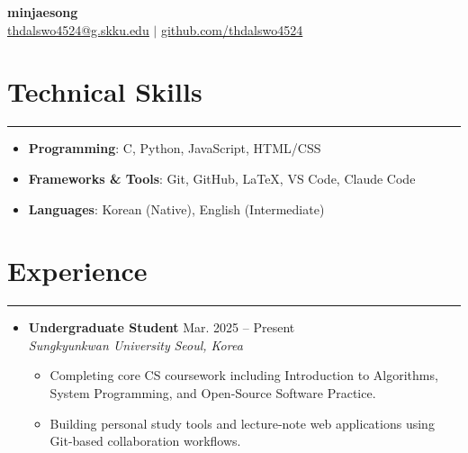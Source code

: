 \documentclass[letterpaper, 10pt]{article}
\begin{document}
\begin{center}
    \textbf{\LARGE minjaesong} \\ \vspace{2pt}
    \href{mailto:thdalswo4524@g.skku.edu}{\underline{thdalswo4524@g.skku.edu}} $|$
    \href{https://github.com/thdalswo4524}{\underline{github.com/thdalswo4524}}
\end{center}

\section*{Technical Skills}
\hrule
\vspace{4pt}
\begin{itemize}
    \item[] \textbf{Programming}: C, Python, JavaScript, HTML/CSS
    \item[] \textbf{Frameworks \& Tools}: Git, GitHub, LaTeX, VS Code, Claude Code
    \item[] \textbf{Languages}: Korean (Native), English (Intermediate)
\end{itemize}

\section*{Experience}
\hrule
\vspace{4pt}
\begin{itemize}
    \item[]
    \textbf{Undergraduate Student} \hfill Mar. 2025 -- Present \\
    \textit{Sungkyunkwan University} \hfill \textit{Seoul, Korea}
    \begin{itemize}
        \item Completing core CS coursework including Introduction to Algorithms, System Programming, and Open-Source Software Practice.
        \item Building personal study tools and lecture-note web applications using Git-based collaboration workflows.
    \end{itemize}
\end{itemize}

\end{document}
